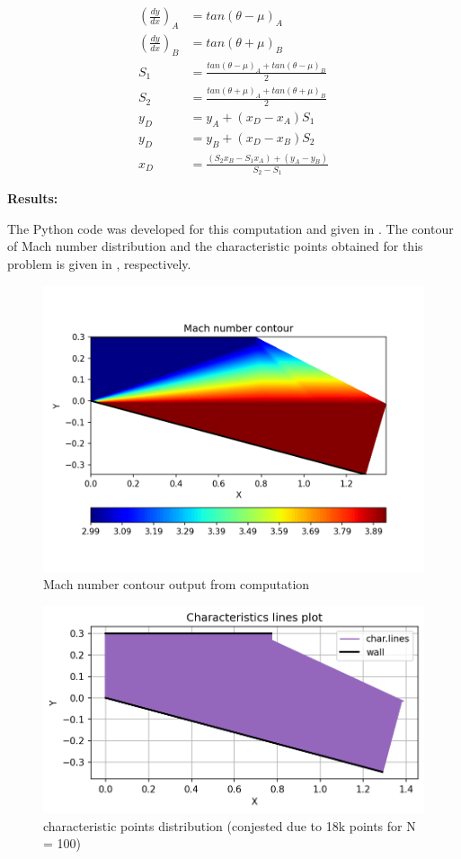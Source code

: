 \begin{align*}
    \left(\frac{dy}{dx}\right)_A &= tan(\theta-\mu)_A \\
    \left(\frac{dy}{dx}\right)_B &= tan(\theta+\mu)_B \\
    S_1 &= \frac{tan(\theta-\mu)_A + tan(\theta-\mu)_B}{2} \\
    S_2 &= \frac{tan(\theta+\mu)_A + tan(\theta+\mu)_B}{2} \\
    y_D &=y_A + (x_D - x_A) S_1 \\
    y_D &=y_B + (x_D - x_B) S_2 \\
    x_D &= \frac{(S_2 x_B - S_1 x_A) + (y_A - y_B)}{S_2-S_1}
\end{align*}

\pagebreak
\textbf{Results:}

The Python code was developed for this computation and given in .
The contour of Mach number distribution and the characteristic points
obtained for this problem is given in , respectively. \\
\begin{figure}
    \center
    \includegraphics[scale=0.9]{results/expansion_corner/M_contour.png}
    \caption{Mach number contour output from computation}
    \label{Mach_contour}
\end{figure}

\begin{figure}
    \center
    \includegraphics[scale=0.9]{results/expansion_corner/char_map.png}
    \caption{characteristic points distribution (conjested due to 18k points for N = 100)}
    \label{char_output}
\end{figure}

